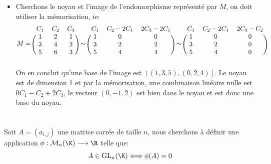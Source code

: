 \begin{itemize}
\[   \]
   Alors l'équation cartésienne du sous-espace des colonnes est \(x - 2y + z = 0\).
   \item Cherchons le noyau et l'image de l'endomorphisme représenté par \(M\), on doit utiliser la mémorisation, ie:
   \[
      M = \begin{blockarray}{ccc} C_1 & C_2 & C_3 \\\begin{block}{(ccc)} 1 & 2 & 1\\3 & 4 & 2\\5 & 6 & 3\\\end{block}\end{blockarray} 
      \sim
      \begin{blockarray}{ccc} C_1 & C_2-2C_1 & 2C_3 - 2C_1 \\\begin{block}{(ccc)} 1 & 0 & 0\\3 & 2 & 2\\5 & 4 & 4\\\end{block}\end{blockarray} 
      \sim
      \begin{blockarray}{ccc} C_1 & C_2-2C_1 & 2C_3 - C_2 \\\begin{block}{(ccc)} 1 & 0 & 0\\3 & 2 & 0\\5 & 4 & 0\\\end{block}\end{blockarray} 
   \]
   On en conclut qu'une base de l'image est \([(1, 3, 5), (0, 2, 4)]\).\+
   Le noyau est de dimension 1 et par la mémorisation, une combinaison linéaire nulle est \(0C_1-C_2+2C_3\), le vecteur \((0, -1, 2)\) est bien dans le noyau et est donc une base du noyau.

\end{itemize}\<

\chapter*{} %

Soit \(A = (a_{i,j})\) une matrice carrée de taille \(n\), nous cherchons à définir une application \(\phi: \mathcal{M}_n(\K) \longrightarrow \R\) telle que:
\[
   A \in \text{GL}_n(\K) \Longleftrightarrow \phi(A) = 0
\]
\subsection*{}

